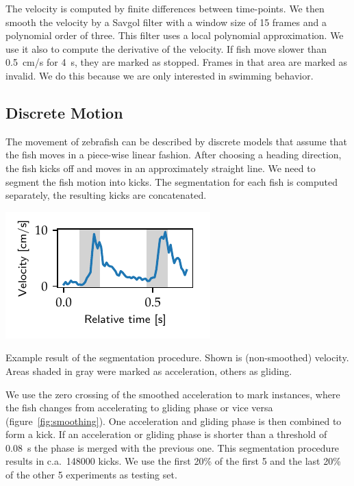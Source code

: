 \documentclass[nobib, a4paper]{tufte-handout}
\begin{document}
The velocity is computed by finite differences between time-points.
We then smooth the velocity by a Savgol filter with a window size of 15 frames and a polynomial order of three.
This filter uses a local polynomial approximation.
We use it also to compute the derivative of the velocity.
If fish move slower than \SI{0.5}{\cm/\s} for \SI{4}{\s}, they are marked as stopped.
Frames in that area are marked as invalid.
We do this because we are only interested in swimming behavior.

\subsection{Discrete Motion}
The movement of zebrafish can be described by discrete models that assume that the fish moves in a piece-wise linear fashion.
After choosing a heading direction, the fish kicks off and moves in an approximately straight line.
We need to segment the fish motion into kicks.
The segmentation for each fish is computed separately, the resulting kicks are concatenated.

\begin{marginfigure}
\includegraphics[scale=1]{smoothing}
\caption{Example result of the segmentation procedure.
  Shown is (non-smoothed) velocity.
  Areas shaded in gray were marked as acceleration, others as gliding.
\label{fig:smoothing}}
\end{marginfigure}

We use the zero crossing of the smoothed acceleration to mark instances, where the fish changes from accelerating to gliding phase or vice versa (figure~\ref{fig:smoothing}).
One acceleration and gliding phase is then combined to form a kick.
If an acceleration or gliding phase is shorter than a threshold of \SI{0.08}{\s} the phase is merged with the previous one.
This segmentation procedure results in c.a.\ 148000 kicks.
We use the first 20\% of the first 5 and the last 20\% of the other 5 experiments as testing set.
\end{document}
